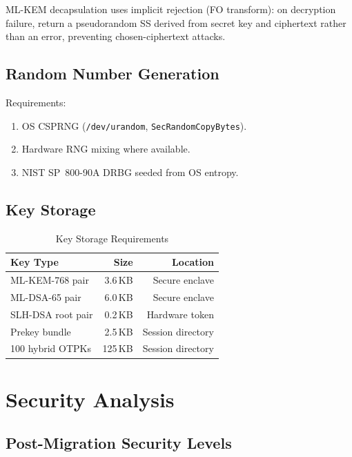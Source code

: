 \documentclass[11pt,a4paper]{article}
\begin{document}
ML-KEM decapsulation uses implicit rejection (FO transform): on
decryption failure, return a pseudorandom SS derived from secret key and
ciphertext rather than an error, preventing chosen-ciphertext attacks.

\subsection{Random Number Generation}

Requirements:
\begin{enumerate}
    \item OS CSPRNG (\texttt{/dev/urandom}, \texttt{SecRandomCopyBytes}).
    \item Hardware RNG mixing where available.
    \item NIST SP~800-90A DRBG seeded from OS entropy.
\end{enumerate}

\subsection{Key Storage}

\begin{table}[h]
\centering
\caption{Key Storage Requirements}
\label{tab:storage}
\begin{tabular}{@{}lrr@{}}
\toprule
\textbf{Key Type} & \textbf{Size} & \textbf{Location} \\
\midrule
ML-KEM-768 pair     & 3.6\,KB  & Secure enclave \\
ML-DSA-65 pair      & 6.0\,KB  & Secure enclave \\
SLH-DSA root pair   & 0.2\,KB  & Hardware token \\
Prekey bundle       & 2.5\,KB  & Session directory \\
100 hybrid OTPKs    & 125\,KB  & Session directory \\
\bottomrule
\end{tabular}
\end{table}

\section{Security Analysis}
\label{sec:security}

\subsection{Post-Migration Security Levels}
\end{document}
